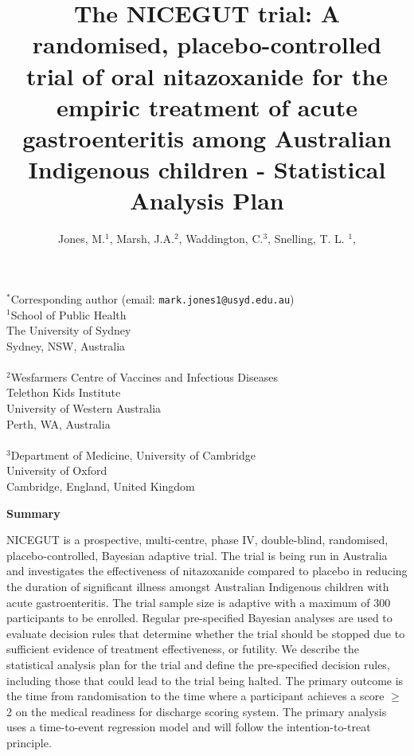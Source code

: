 \documentclass[a4paper]{article}
\title{The NICEGUT trial: A randomised, placebo-controlled trial of oral nitazoxanide for the empiric treatment of acute gastroenteritis among Australian Indigenous children - Statistical Analysis Plan}
\author{Jones, M.$^{1}$, Marsh, J.A.$^{2}$, Waddington, C.$^{3}$, Snelling, T. L. $^{1}$, \\ }
\begin{document}
\maketitle

$^*$Corresponding author (email: \texttt{mark.jones1@usyd.edu.au}) \\
$^1$School of Public Health \\
The University of Sydney \\
Sydney, NSW, Australia \\
~ \\
$^2$Wesfarmers Centre of Vaccines and Infectious Diseases \\
Telethon Kids Institute \\
University of Western Australia \\
Perth, WA, Australia \\
~ \\
$^3$Department of Medicine, University of Cambridge \\
University of Oxford \\
Cambridge, England, United Kingdom

\newcommand{\newbf}[1]{\mbox{\boldmath{$#1$}}}

\begin{center}\textbf{Summary}
\end{center}

NICEGUT is a prospective, multi-centre, phase IV, double-blind, randomised, placebo-controlled, Bayesian adaptive trial.
The trial is being run in Australia and investigates the effectiveness of nitazoxanide compared to placebo in reducing the duration of significant illness amongst Australian Indigenous children with acute gastroenteritis. 
The trial sample size is adaptive with a maximum of 300 participants to be enrolled.
Regular pre-specified Bayesian analyses are used to evaluate decision rules that determine whether the trial should be stopped due to sufficient evidence of treatment effectiveness, or futility. 
We describe the statistical analysis plan for the trial and define the pre-specified decision rules, including those that could lead to the trial being halted.
The primary outcome is the time from randomisation to the time where a participant achieves a score $\ge$ 2 on the medical readiness for discharge scoring system.
The primary analysis uses a time-to-event regression model and will follow the intention-to-treat principle.  

\end{document}
